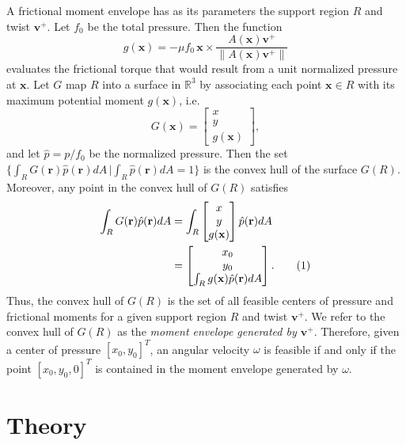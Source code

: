 \documentclass[conference]{IEEEtran}
\newcommand\numberthis{\addtocounter{equation}{1}\tag{\theequation}}
\begin{document}
A frictional moment envelope has as its parameters the support region
$R$ and twist $\mathbf{v}^+$. Let $f_0$ be the total pressure. Then
the function
\begin{equation}
  g(\mathbf{x}) = -\mu f_0\,\mathbf{x}\times \frac{A(\mathbf{x})\mathbf{v}^+}{\lVert A(\mathbf{x})\mathbf{v}^+ \rVert} \label{eq:unit-moment-at-x}
\end{equation}
evaluates the frictional torque that would result from a unit
normalized pressure at $\mathbf{x}$. Let $G$ map $R$ into a surface in
$\mathbb{R}^3$ by associating each point $\mathbf{x} \in R$ with its
maximum potential moment $g(\mathbf{x})$, i.e.
\begin{equation}
G(\mathbf{x}) =
\begin{bmatrix*}
  x\\
  y\\
  g(\mathbf{x})
\end{bmatrix*}, \label{eq:moment-surface-function}
\end{equation}
and let $\hat{p} = p/f_0$ be the normalized pressure. Then the set
$\{\int_RG(\mathbf{r})\hat{p}(\mathbf{r})dA
\,|\int_R\hat{p}(\mathbf{r})dA=1 \}$
is the convex hull of the surface $G(R)$. Moreover, any point in the
convex hull of $G(R)$ satisfies
\begin{align*}
  \int_R G(\mathbf{r}) \hat{p}(\mathbf{r})dA &= \int_R 
  \begin{bmatrix*}
    x\\
    y\\
    g(\mathbf{x})
  \end{bmatrix*}
  \hat{p}(\mathbf{r})dA\\
  &= 
    \begin{bmatrix*}
      x_0\\
      y_0\\
      \int_R g(\mathbf{x}) \hat{p}(\mathbf{r})dA
    \end{bmatrix*}. \numberthis
\end{align*}
Thus, the convex hull of $G(R)$ is the set of all feasible centers of
pressure and frictional moments for a given support region $R$ and
twist $\mathbf{v}^+$. We refer to the convex hull of $G(R)$ as the
\textit{moment envelope generated by $\mathbf{v}^+$}.  Therefore,
given a center of pressure $[x_0,y_0]^T$, an angular velocity $\omega$
is feasible if and only if the point $[x_0,y_0,0]^T$ is contained in
the moment envelope generated by $\omega$.

\section{Theory}\label{sec:theory}
\end{document}
